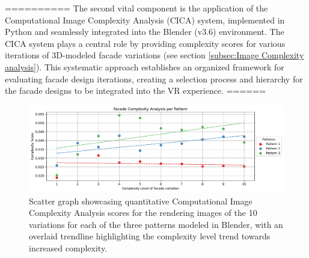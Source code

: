 %    
==========
The second vital component is the application of the Computational Image Complexity Analysis (CICA) system, implemented in Python and seamlessly integrated into the Blender (v3.6) environment.
The CICA system plays a central role by providing complexity scores for various iterations of 3D-modeled facade variations (see section \ref{subsec:Image Complexity analysis}).
This systematic approach establishes an organized framework for evaluating facade design iterations, creating a selection process and hierarchy for the facade designs to be integrated into the VR experience.
======



     \begin{figure}[htb]
          \centering
          \includegraphics[width= \linewidth]{Graphs/complexitygraphrender}
          \caption{Scatter graph showcasing quantitative Computational Image Complexity Analysis scores for the rendering images of the 10 variations for each of the three patterns modeled in Blender, with an overlaid trendline highlighting the complexity level trend towards increased complexity.}
          \label{fig:complexitygraphRender}
        \end{figure}